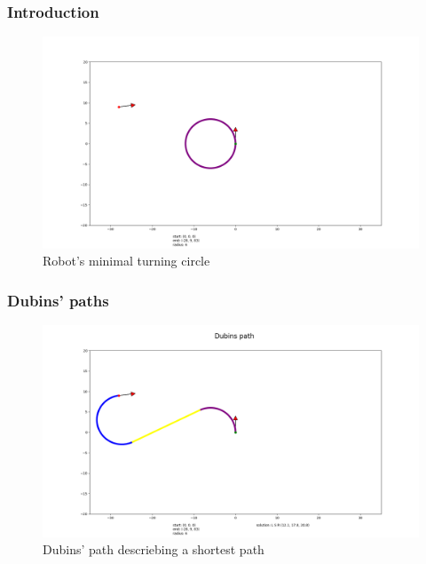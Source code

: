 \documentclass{beamer}
\begin{document}
\begin{frame}

\frametitle{Introduction}

\begin{figure}
\centering
  \centering
  \includegraphics[width=1.1\linewidth]{Illustrations/robotMinimumCircle.png}
  \caption{Robot's minimal turning circle}
  \label{fig:sub1}
\end{figure}
\end{frame}

\begin{frame}

\frametitle{Dubins' paths}

\begin{figure}
\centering
  \centering
  \includegraphics[width=1.1\linewidth]{Illustrations/002.png}
  \caption{Dubins' path descriebing a shortest path}
  \label{fig:sub1}
\end{figure}
\end{frame}
\end{document}
